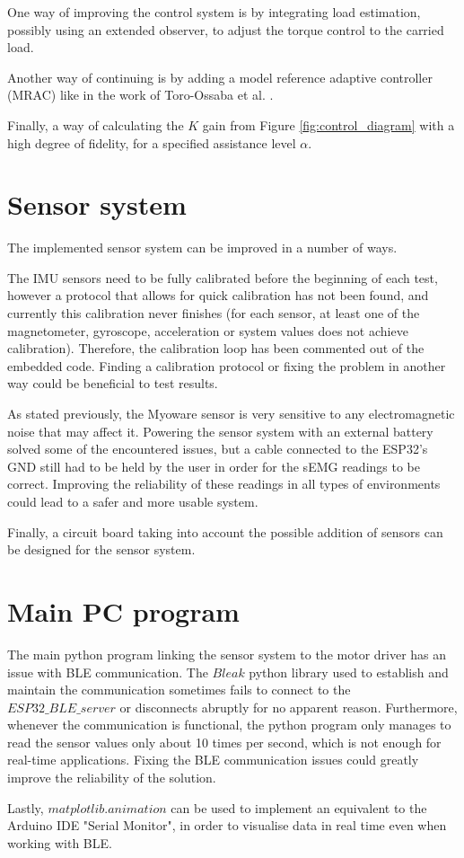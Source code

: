 One way of improving the control system is by integrating load estimation, 
possibly using an extended observer, to adjust the torque control to the 
carried load. 

Another way of continuing is by adding a model reference adaptive controller (MRAC) 
like in the work of Toro-Ossaba et al. \cite{toro-ossaba_myoelectric_2024}.  

Finally, a way of calculating the $K$ gain from Figure \ref{fig:control_diagram} 
with a high degree of fidelity, for a specified assistance level $\alpha$.  

\FloatBarrier
\section{Sensor system}
The implemented sensor system can be improved in a number of ways.  

The IMU sensors need to be fully calibrated before the beginning of each test, 
however a protocol that allows for quick calibration has not been found, 
and currently this calibration never finishes (for each sensor, at least one of 
the magnetometer, gyroscope, acceleration or system values does not achieve calibration). 
Therefore, the calibration loop has been commented out of the embedded code. 
Finding a calibration protocol or fixing the problem in another way could be 
beneficial to test results.  

As stated previously, the Myoware sensor is very sensitive to any electromagnetic 
noise that may affect it. Powering the sensor system with an external battery solved 
some of the encountered issues, but a cable connected to the ESP32's GND still 
had to be held by the user in order for the sEMG readings to be correct. 
Improving the reliability of these readings in all types of environments could 
lead to a safer and more usable system.  

Finally, a circuit board taking into account the possible addition of sensors can be 
designed for the sensor system.  

\FloatBarrier
\section{Main PC program}
The main python program linking the sensor system to the motor driver has an issue 
with BLE communication. The $Bleak$ python library used to establish and maintain 
the communication sometimes fails to connect to the $ESP32\_BLE\_server$ or 
disconnects abruptly for no apparent reason. Furthermore, whenever the communication 
is functional, the python program only manages to read the sensor values only about 
10 times per second, which is not enough for real-time applications. Fixing the BLE 
communication issues could greatly improve the reliability of the solution.

Lastly, $matplotlib.animation$ can be used to implement an equivalent to the 
Arduino IDE "Serial Monitor", in order to visualise data in real time even when 
working with BLE.  
\FloatBarrier
